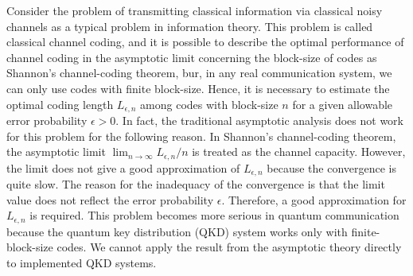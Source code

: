 Consider the problem of transmitting classical information via classical noisy channels 
as a typical problem in information theory.
This problem is called classical channel coding, and 
it is possible to describe the optimal performance of channel coding 
in the asymptotic limit concerning the block-size of codes as Shannon's channel-coding theorem,
bur, in any real communication system, we can only use codes with finite block-size. 
Hence, 
it is necessary to estimate the optimal coding length $L_{\epsilon,n}$ among codes with block-size $n$
for a given allowable error probability $\epsilon>0$.
In fact, the traditional asymptotic analysis does not work for this problem for the following reason.
In Shannon's channel-coding theorem,
the asymptotic limit $\lim_{n \to \infty} L_{\epsilon,n}/n$ is treated as the channel capacity.
However, the limit does not give a good approximation of $L_{\epsilon,n}$ %
because the convergence is quite slow. 
The reason for the inadequacy of the convergence is that the limit value does not reflect the error probability $\epsilon$.
Therefore, a good approximation for $L_{\epsilon,n}$ is required.
This problem becomes more serious in quantum communication
because the quantum key distribution (QKD) system works only with finite-block-size codes.
We cannot apply the result from the asymptotic theory directly to implemented QKD systems. 


